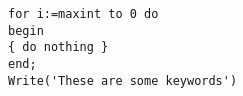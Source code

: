 
\lstset{ 
	extendedchars=true,              %
	keepspaces=true,                 %
	language=Pascal,                 %
	showstringspaces=false
}

\begin{lstlisting}[frame=single]  % Start your code-block
for i:=maxint to 0 do
begin
{ do nothing }
end;
Write('These are some keywords')
\end{lstlisting}